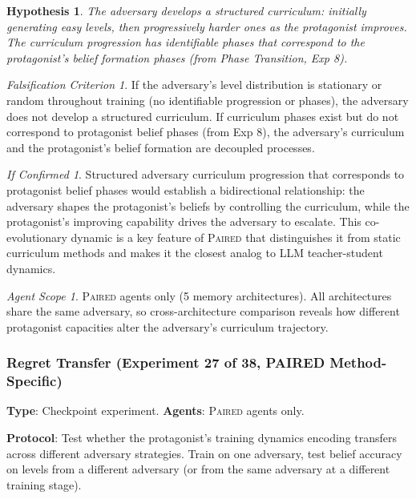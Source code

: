 \documentclass[11pt,a4paper]{article}
\newtheorem{hypothesis}{Hypothesis}[subsection]
\theoremstyle{remark}
\newtheorem*{falsification}{Falsification Criterion}
\newtheorem*{implication}{If Confirmed}
\newtheorem*{agentscope}{Agent Scope}
\newcommand{\paired}{\textsc{Paired}}
\begin{document}
\begin{hypothesis}
The adversary develops a structured curriculum: initially generating easy levels, then progressively harder ones as the protagonist improves. The curriculum progression has identifiable phases that correspond to the protagonist's belief formation phases (from Phase Transition, Exp 8).
\end{hypothesis}

\begin{falsification}
If the adversary's level distribution is stationary or random throughout training (no identifiable progression or phases), the adversary does not develop a structured curriculum. If curriculum phases exist but do not correspond to protagonist belief phases (from Exp 8), the adversary's curriculum and the protagonist's belief formation are decoupled processes.
\end{falsification}

\begin{implication}
Structured adversary curriculum progression that corresponds to protagonist belief phases would establish a bidirectional relationship: the adversary shapes the protagonist's beliefs by controlling the curriculum, while the protagonist's improving capability drives the adversary to escalate. This co-evolutionary dynamic is a key feature of \paired{} that distinguishes it from static curriculum methods and makes it the closest analog to LLM teacher-student dynamics.
\end{implication}

\begin{agentscope}
\paired{} agents only (5 memory architectures). All architectures share the same adversary, so cross-architecture comparison reveals how different protagonist capacities alter the adversary's curriculum trajectory.
\end{agentscope}

\subsubsection{Regret Transfer (Experiment 27 of 38, PAIRED Method-Specific)}
\label{exp:regret_transfer}

\textbf{Type}: Checkpoint experiment. \textbf{Agents}: \paired{} agents only.

\textbf{Protocol}: Test whether the protagonist's training dynamics encoding transfers across different adversary strategies. Train on one adversary, test belief accuracy on levels from a different adversary (or from the same adversary at a different training stage).
\end{document}
